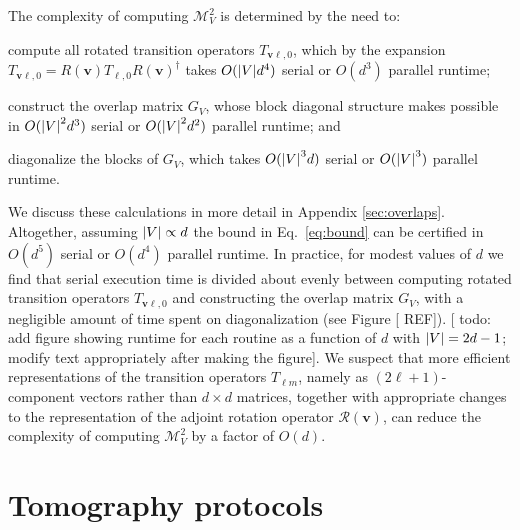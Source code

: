 \documentclass[notitlepage,twocolumn]{revtex4-2}
\newcommand{\p}[1]{\left(#1\right)} %
\renewcommand{\v}{\bm} %
\newcommand{\1}{\mathds{1}}
\newcommand{\M}{\mathcal{M}}
\newcommand{\R}{\mathcal{R}}
\newcommand{\red}[1]{{\color{red} #1}}
\begin{document}
The complexity of computing $\M_V^2$ is determined by the need to:
\begin{enumerate*}
\item compute all rotated transition operators $T_{\v v\ell,0}$, which by the expansion $T_{\v v\ell,0}=R\p{\v v}T_{\ell,0}R\p{\v v}^\dag$ takes $O(\abs{V}d^4)$ serial or $O(d^3)$ parallel runtime;
\item construct the overlap matrix $G_V$, whose block diagonal structure makes possible in $O(\abs{V}^2d^3)$ serial or $O(\abs{V}^2d^2)$ parallel runtime; and
\item diagonalize the blocks of $G_V$, which takes $O(\abs{V}^3d)$ serial or $O(\abs{V}^3)$ parallel runtime.
\end{enumerate*}
We discuss these calculations in more detail in Appendix \ref{sec:overlaps}.
Altogether, assuming $\abs{V}\propto d$ the bound in Eq.~\eqref{eq:bound} can be certified in $O(d^5)$ serial or $O(d^4)$ parallel runtime.
In practice, for modest values of $d$ we find that serial execution time is divided about evenly between computing rotated transition operators $T_{\v v\ell,0}$ and constructing the overlap matrix $G_V$, with a negligible amount of time spent on diagonalization (see Figure [\red{REF}]).  [\red{todo: add figure showing runtime for each routine as a function of $d$ with $\abs{V}=2d-1$; modify text appropriately after making the figure}].
We suspect that more efficient representations of the transition operators $T_{\ell m}$, namely as $\p{2\ell+1}$-component vectors rather than $d\times d$ matrices, together with appropriate changes to the representation of the adjoint rotation operator $\R\p{\v v}$, can reduce the complexity of computing $\M_V^2$ by a factor of $O(d)$.

\section{Tomography protocols}
\label{sec:protocol}
\end{document}
